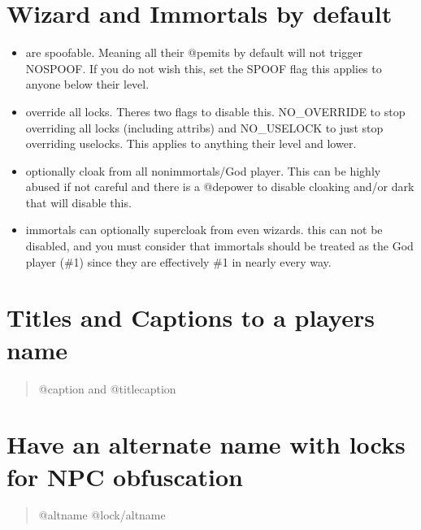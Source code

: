 \documentclass[letterpaper,10pt,english]{sphinxmanual}
\begin{document}
\section{Wizard and Immortals by default}
\label{\detokenize{features:wizard-and-immortals-by-default}}\begin{itemize}
\item {} 
\sphinxAtStartPar
are spoofable.  Meaning all their @pemits by default will not
trigger NOSPOOF.  If you do not wish this, set the SPOOF flag
this applies to anyone below their level.

\item {} 
\sphinxAtStartPar
override all locks.  There\textquotesingle{}s two flags to disable this.
NO\_OVERRIDE to stop overriding all locks (including attribs)
and NO\_USELOCK to just stop overriding uselocks.
This applies to anything their level and lower.

\item {} 
\sphinxAtStartPar
optionally cloak from all non\sphinxhyphen{}immortals/God player.
This can be highly abused if not careful and there
is a @depower to disable cloaking and/or dark that will
disable this.

\item {} 
\sphinxAtStartPar
immortals can optionally supercloak from even wizards.
this can not be disabled, and you must consider that immortals
should be treated as the God player (\#1) since they are
effectively \#1 in nearly every way.

\end{itemize}


\section{Titles and Captions to a player\textquotesingle{}s name}
\label{\detokenize{features:titles-and-captions-to-a-player-s-name}}\begin{quote}

\sphinxAtStartPar
@caption and @titlecaption
\end{quote}


\section{Have an alternate name with locks for NPC obfuscation}
\label{\detokenize{features:have-an-alternate-name-with-locks-for-npc-obfuscation}}\begin{quote}

\sphinxAtStartPar
@altname
@lock/altname
\end{quote}
\end{document}
